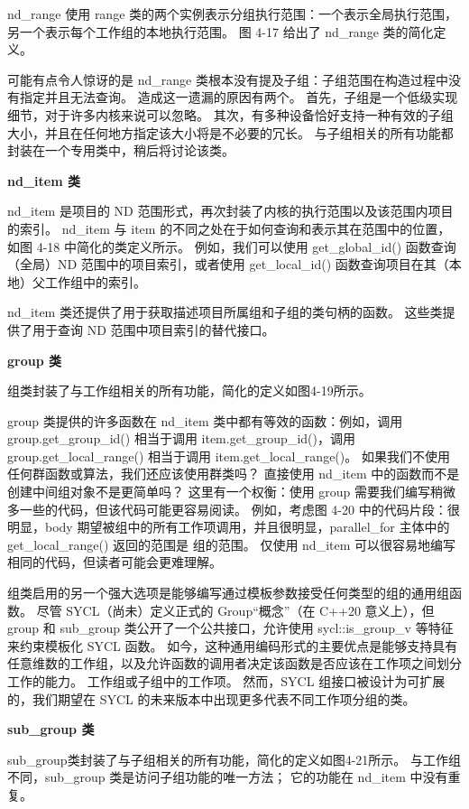 nd\_range 使用 range 类的两个实例表示分组执行范围：一个表示全局执行范围，另一个表示每个工作组的本地执行范围。 图 4-17 给出了 nd\_range 类的简化定义。

可能有点令人惊讶的是 nd\_range 类根本没有提及子组：子组范围在构造过程中没有指定并且无法查询。 造成这一遗漏的原因有两个。 首先，子组是一个低级实现细节，对于许多内核来说可以忽略。 其次，有多种设备恰好支持一种有效的子组大小，并且在任何地方指定该大小将是不必要的冗长。 与子组相关的所有功能都封装在一个专用类中，稍后将讨论该类。

\textbf{nd\_item 类}

nd\_item 是项目的 ND 范围形式，再次封装了内核的执行范围以及该范围内项目的索引。 nd\_item 与 item 的不同之处在于如何查询和表示其在范围中的位置，如图 4-18 中简化的类定义所示。 例如，我们可以使用 get\_global\_id() 函数查询（全局）ND 范围中的项目索引，或者使用 get\_local\_id() 函数查询项目在其（本地）父工作组中的索引。

nd\_item 类还提供了用于获取描述项目所属组和子组的类句柄的函数。 这些类提供了用于查询 ND 范围中项目索引的替代接口。

\textbf{group 类}

组类封装了与工作组相关的所有功能，简化的定义如图4-19所示。

group 类提供的许多函数在 nd\_item 类中都有等效的函数：例如，调用 group.get\_group\_id() 相当于调用 item.get\_group\_id()，调用 group.get\_local\_range() 相当于调用 item.get\_local\_range()。 如果我们不使用任何群函数或算法，我们还应该使用群类吗？ 直接使用 nd\_item 中的函数而不是创建中间组对象不是更简单吗？ 这里有一个权衡：使用 group 需要我们编写稍微多一些的代码，但该代码可能更容易阅读。 例如，考虑图 4-20 中的代码片段：很明显，body 期望被组中的所有工作项调用，并且很明显，parallel\_for 主体中的 get\_local\_range() 返回的范围是 组的范围。 仅使用 nd\_item 可以很容易地编写相同的代码，但读者可能会更难理解。

组类启用的另一个强大选项是能够编写通过模板参数接受任何类型的组的通用组函数。 尽管 SYCL（尚未）定义正式的 Group“概念”（在 C++20 意义上），但 group 和 sub\_group 类公开了一个公共接口，允许使用 sycl::is\_group\_v 等特征来约束模板化 SYCL 函数。 如今，这种通用编码形式的主要优点是能够支持具有任意维数的工作组，以及允许函数的调用者决定该函数是否应该在工作项之间划分工作的能力。 工作组或子组中的工作项。 然而，SYCL 组接口被设计为可扩展的，我们期望在 SYCL 的未来版本中出现更多代表不同工作项分组的类。

\textbf{sub\_group 类}

sub\_group类封装了与子组相关的所有功能，简化的定义如图4-21所示。 与工作组不同，sub\_group 类是访问子组功能的唯一方法； 它的功能在 nd\_item 中没有重复。

